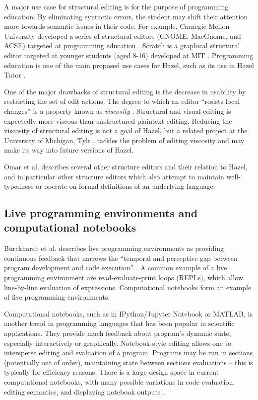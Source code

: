 A major use case for structural editing is for the purpose of programming education. By eliminating syntactic errors, the student may shift their attention more towards semantic issues in their code. For example, Carnegie Mellon University developed a series of structural editors (GNOME, MacGnome, and ACSE)  targeted at programming education \cite{miller1994evolution}. Scratch is a graphical structural editor targeted at younger students (aged 8-16) developed at MIT \cite{maloney2010scratch}. Programming education is one of the main proposed use cases for Hazel, such as its use in Hazel Tutor \cite{potter2020hazel}.

One of the major drawbacks of structural editing is the decrease in usability by restricting the set of edit actions. The degree to which an editor ``resists local changes'' is a property known as \textit{viscosity} \cite{green1989cognitive}. Structural and visual editing is expectedly more viscous than unstructured plaintext editing. Reducing the viscosity of structural editing is not a goal of Hazel, but a related project at the University of Michigan, Tylr \cite{tylr}, tackles the problem of editing viscosity and may make its way into future versions of Hazel.

Omar et al. \cite{conf/popl/Hazelnut17} describes several other structure editors and their relation to Hazel, and in particular other structure editors which also attempt to maintain well-typedness or operate on formal definitions of an underlying language.

\subsection{Live programming environments and computational notebooks}
\label{sec:notebook-editors}

Burckhardt et al. describes live programming environments as providing continuous feedback that narrows the ``temporal and perceptive gap between program development and code execution''
 \cite{10.1145/2499370.2462170}. A common example of a live programming environment are read-evaluate-print loops (REPLs), which allow line-by-line evaluation of expressions. Computational notebooks form an example of live programming environments.

Computational notebooks, such as in IPython/Jupyter Notebook \cite{perez2007ipython} or MATLAB, is another trend in programming languages that has been popular in scientific applications. They provide much feedback about program's dynamic state, especially interactively or graphically. Notebook-style editing allows one to intersperse editing and evaluation of a program. Programs may be run in sections (potentially out of order), maintaining state between sections evaluations -- this is typically for efficiency reasons. There is a large design space in current computational notebooks, with many possible variations in code evaluation, editing semantics, and displaying notebook outputs \cite{lau2020design}.

